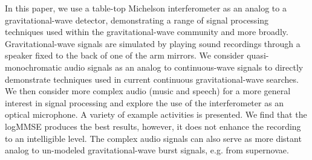\documentclass[paper-main.tex]{subfiles}
\begin{document}
In this paper, we use a table-top Michelson interferometer as an analog to a gravitational-wave detector, demonstrating a range of signal processing techniques used within the gravitational-wave community and more broadly. 
Gravitational-wave signals are simulated by playing sound recordings through a speaker fixed to the back of one of the arm mirrors. 
We consider quasi-monochromatic audio signals as an analog to continuous-wave signals to directly demonstrate techniques used in current continuous gravitational-wave searches.
We then consider more complex audio (music and speech) for a more general interest in signal processing and explore the use of the interferometer as an optical microphone. 
A variety of example activities is presented. 
We find that the logMMSE produces the best results, however, it does not enhance the recording to an intelligible level. 
The complex audio signals can also serve as more distant analog to un-modeled gravitational-wave burst signals, e.g. from supernovae. 
\end{document}
